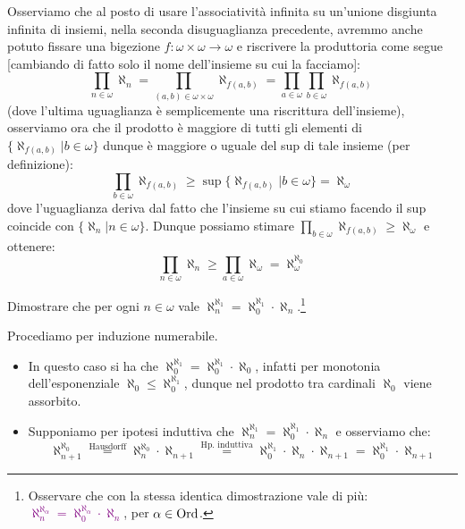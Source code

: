 \begin{remark}
	Osserviamo che al posto di usare l'associativit\`a infinita su un'unione disgiunta infinita di insiemi, nella seconda disuguaglianza precedente, avremmo anche potuto fissare una bigezione $f : \omega \times \omega \to \omega$
	e riscrivere la produttoria come segue [cambiando di fatto solo il nome dell'insieme su cui la facciamo]:
	\[ \prod_{n \in \omega} \aleph_n = \prod_{(a,b)\in \omega \times \omega} \aleph_{f(a,b)} = \prod_{a \in \omega} \prod_{b \in \omega} \aleph_{f(a,b)}
		\]
	(dove l'ultima uguaglianza \`e semplicemente una riscrittura dell'insieme), osserviamo ora che il prodotto \`e maggiore di tutti gli elementi di $\{\aleph_{f(a,b)} | b \in \omega\}$ dunque \`e maggiore o uguale del sup di tale insieme (per definizione):
	\[ \prod_{b \in \omega} \aleph_{f(a,b)} \geq \sup\{\aleph_{f(a,b)} | b \in \omega\} = \aleph_\omega
		\]
	dove l'uguaglianza deriva dal fatto che l'insieme su cui stiamo facendo il sup coincide con $\{\aleph_n | n \in \omega\}$. Dunque possiamo stimare $\prod_{b \in \omega} \aleph_{f(a,b)} \geq \aleph_\omega$ e ottenere:
	\[ \prod_{n \in \omega} \aleph_n \geq \prod_{a \in \omega} \aleph_\omega = \aleph_\omega^{\aleph_0}
		\]
\end{remark}

\begin{exercise}[$\aleph_n^{\aleph_1} = \aleph_0^{\aleph_1}\cdot \aleph_n$]
	Dimostrare che per ogni $n \in \omega$ vale $\aleph_n^{\aleph_1} = \aleph_0^{\aleph_1}\cdot \aleph_n$.\footnote{Osservare che con la stessa identica dimostrazione vale di pi\`u: \textcolor{purple}{$\aleph_n^{\aleph_\alpha} = \aleph_0^{\aleph_\alpha} \cdot \aleph_n$}, per $\alpha \in \operatorname{Ord}$.}
\end{exercise}

\begin{soln}
	Procediamo per induzione numerabile.
	\begin{itemize}
		\item[$\boxed{\text{caso $n = 0$}}$] In questo caso si ha che $\aleph_0^{\aleph_1} = \aleph_0^{\aleph_1} \cdot \aleph_0$, infatti per monotonia dell'esponenziale $\aleph_0 \leq \aleph_0^{\aleph_1}$, dunque nel prodotto tra cardinali $\aleph_0$ viene assorbito.
		\item[$\boxed{\text{caso $n + 1$}}$] Supponiamo per ipotesi induttiva che $\aleph_n^{\aleph_1} = \aleph_0^{\aleph_1}\cdot \aleph_n$ e osserviamo che:
		\[ \aleph_{n+1}^{\aleph_0} \overset{\text{Hausdorff}}{=} \aleph_n^{\aleph_0} \cdot \aleph_{n+1} \overset{\text{Hp. induttiva}}{=} \aleph_0^{\aleph_1}\cdot \aleph_n \cdot \aleph_{n+1} = \aleph_0^{\aleph_1} \cdot \aleph_{n+1}
			\]
	\end{itemize}
\end{soln}

